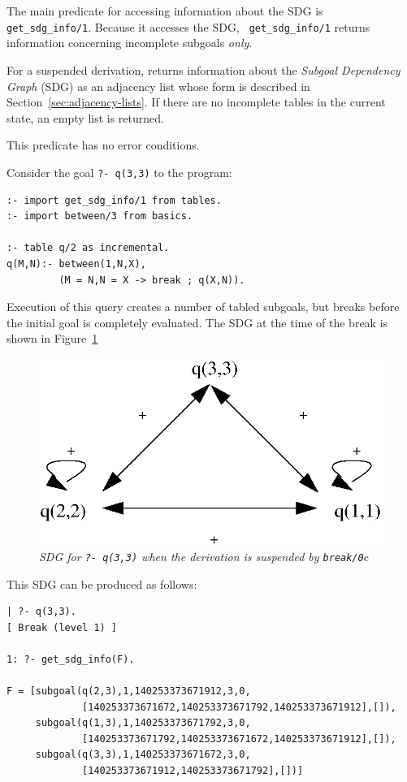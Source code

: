 The main predicate for accessing information about the SDG is {\tt
  get\_sdg\_info/1}.  Because it accesses the SDG, {\tt
  get\_sdg\_info/1} returns information concerning incomplete subgoals
{\em only}.

\begin{description}
%
For a suspended derivation, returns information about the {\em
  Subgoal Dependency Graph} (SDG) as an adjacency list whose form is
described in Section~\ref{sec:adjacency-lists}.
%
If there are no incomplete tables in the current state, an empty list
is returned.

This predicate has no error conditions.

\begin{example} \rm \label{ex:get-sdg}
Consider the goal {\tt ?- q(3,3)} to the program:

\begin{verbatim}
:- import get_sdg_info/1 from tables.
:- import between/3 from basics.

:- table q/2 as incremental.
q(M,N):- between(1,N,X),
         (M = N,N = X -> break ; q(X,N)).
\end{verbatim}
Execution of this query creates a number of tabled subgoals, but
breaks before the initial goal is completely evaluated.  The SDG at
the time of the break is shown in Figure~\ref{fig:sdg-break-1}

\begin{figure}[htbp]
\centering
\includegraphics[width=.4\textwidth]{sdg-q-2}
\caption{{\em SDG for {\tt ?- q(3,3)} when the derivation is suspended by
  {\tt break/0}}c} \label{fig:sdg-break-1}
\end{figure}
%
This SDG can be produced as follows:
\begin{small}
\begin{verbatim}
| ?- q(3,3).
[ Break (level 1) ]

1: ?- get_sdg_info(F).

F = [subgoal(q(2,3),1,140253373671912,3,0,
             [140253373671672,140253373671792,140253373671912],[]),
     subgoal(q(1,3),1,140253373671792,3,0,
             [140253373671792,140253373671672,140253373671912],[]),
     subgoal(q(3,3),1,140253373671672,3,0,
             [140253373671912,140253373671792],[])]
\end{verbatim}
\end{small}


\end{example}
\end{description}
